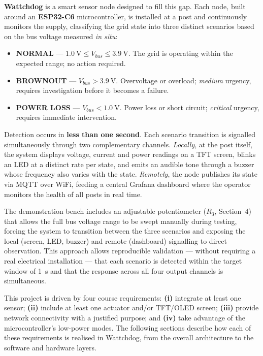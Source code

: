 \documentclass[10pt,a4paper]{article}
\begin{document}
\textbf{Wattchdog} is a smart sensor node designed to fill this gap. Each node,
built around an \textbf{ESP32-C6} microcontroller, is installed at a post and
continuously monitors the supply, classifying the grid state into three distinct
scenarios based on the bus voltage measured \emph{in situ}:

\begin{itemize}[noitemsep]
  \item \textbf{NORMAL} --- $\SI{1.0}{\volt} \le V_{bus} \le \SI{3.9}{\volt}$.
        The grid is operating within the expected range; no action required.
  \item \textbf{BROWNOUT} --- $V_{bus} > \SI{3.9}{\volt}$. Overvoltage or overload;
        \emph{medium} urgency, requires investigation before it becomes a failure.
  \item \textbf{POWER LOSS} --- $V_{bus} < \SI{1.0}{\volt}$. Power loss or short
        circuit; \emph{critical} urgency, requires immediate intervention.
\end{itemize}

Detection occurs in \textbf{less than one second}. Each scenario transition is
signalled simultaneously through two complementary channels. \emph{Locally}, at
the post itself, the system displays voltage, current and power readings on a TFT
screen, blinks an LED at a distinct rate per state, and emits an audible tone
through a buzzer whose frequency also varies with the state. \emph{Remotely}, the
node publishes its state via MQTT over WiFi, feeding a central Grafana dashboard
where the operator monitors the health of all posts in real time.

The demonstration bench includes an adjustable potentiometer ($R_3$, Section~4)
that allows the full bus voltage range to be swept manually during testing, forcing
the system to transition between the three scenarios and exposing the local (screen,
LED, buzzer) and remote (dashboard) signalling to direct observation. This approach
allows reproducible validation --- without requiring a real electrical installation
--- that each scenario is detected within the target window of \SI{1}{\second} and
that the response across all four output channels is simultaneous.

This project is driven by four course requirements: \textbf{(i)} integrate at least
one sensor; \textbf{(ii)} include at least one actuator and/or TFT/OLED screen;
\textbf{(iii)} provide network connectivity with a justified purpose; and
\textbf{(iv)} take advantage of the microcontroller's low-power modes. The following
sections describe how each of these requirements is realised in Wattchdog, from the
overall architecture to the software and hardware layers.
\end{document}
